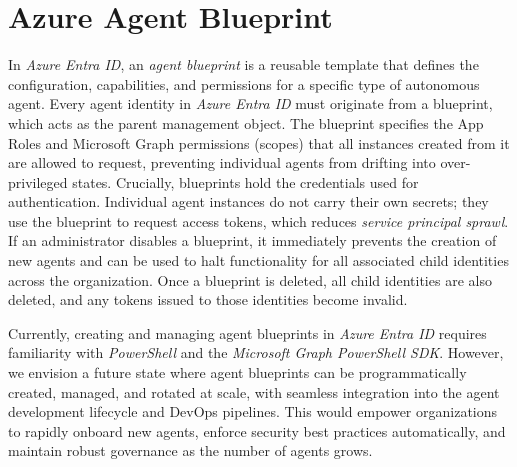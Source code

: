 \documentclass[9pt]{extarticle}%
\begin{document}
\section{Azure Agent Blueprint}%
\label{sec:agent_blueprint}%
In \textit{Azure Entra ID}, an \textit{agent blueprint} is a reusable template that defines the configuration, capabilities, and permissions for a specific type of autonomous agent. Every agent identity in \textit{Azure Entra ID} must originate from a blueprint, which acts as the parent management object. The blueprint specifies the App Roles and Microsoft Graph permissions (scopes) that all instances created from it are allowed to request, preventing individual agents from drifting into over-privileged states. Crucially, blueprints hold the credentials used for authentication. Individual agent instances do not carry their own secrets; they use the blueprint to request access tokens, which reduces \textit{service principal sprawl}. If an administrator disables a blueprint, it immediately prevents the creation of new agents and can be used to halt functionality for all associated child identities across the organization. Once a blueprint is deleted, all child identities are also deleted, and any tokens issued to those identities become invalid.
%
\par\vspace{\baselineskip}%
Currently, creating and managing agent blueprints in \textit{Azure Entra ID} requires familiarity with \textit{PowerShell} and the \textit{Microsoft Graph PowerShell SDK}. However, we envision a future state where agent blueprints can be programmatically created, managed, and rotated at scale, with seamless integration into the agent development lifecycle and DevOps pipelines. This would empower organizations to rapidly onboard new agents, enforce security best practices automatically, and maintain robust governance as the number of agents grows.
%
\par\vspace{\baselineskip}%
\end{document}
